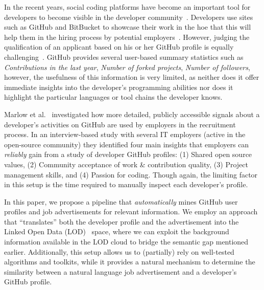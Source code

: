 \documentclass[conference]{IEEEtran}
\begin{document}
In the recent years, social coding platforms have become an important tool for
developers to become visible in the developer community~\cite{Capil13}.
Developers use sites such as GitHub and BitBucket to showcase their work in the
hoe that this will help them in the hiring process by potential
employers~\cite{dabbish2012social}. However, judging the qualification of an
applicant based on his or her GitHub profile is equally
challenging~\cite{Singer:2013:MAS:2441776.2441791}. GitHub provides several
user-based summary statistics such as \emph{Contributions in the last year},
\emph{Number of forked projects}, \emph{Number of followers}, however, the
usefulness of this information is very limited, as neither does it offer
immediate insights into the developer's programming abilities nor does it
highlight the particular languages or tool chains the developer knows.

 Marlow et al.~\cite{Marlow:2013:ATS:2441776.2441794}
investigated how more detailed, publicly accessible signals about a developer's
activities on GitHub are used by employers in the recruitment process. In an
interview-based study with several IT employers (active in the open-source
community) they identified four main insights that employers can \emph{reliably}
gain from a study of developer GitHub profiles: (1) Shared open source values,
(2) Community acceptance of work \& contribution quality, (3) Project management
skills, and (4) Passion for coding. Though again, the limiting factor in this
setup is the time required to manually inspect each developer's profile.

%
In this paper, we propose a pipeline that \emph{automatically} mines GitHub user
profiles and job advertisements for relevant information. We employ an approach
that ``translates'' both the developer profile and the advertisement into the
Linked Open Data (LOD)~\cite{bizer2009linked} space, where we can exploit the
background information available in the LOD cloud to bridge the semantic gap
mentioned earlier. Additionally, this setup allows us to (partially) rely on
well-tested algorithms and toolkits, while it provides a natural mechanism to
determine the similarity between a natural language job advertisement and a
developer's GitHub profile.
\end{document}

